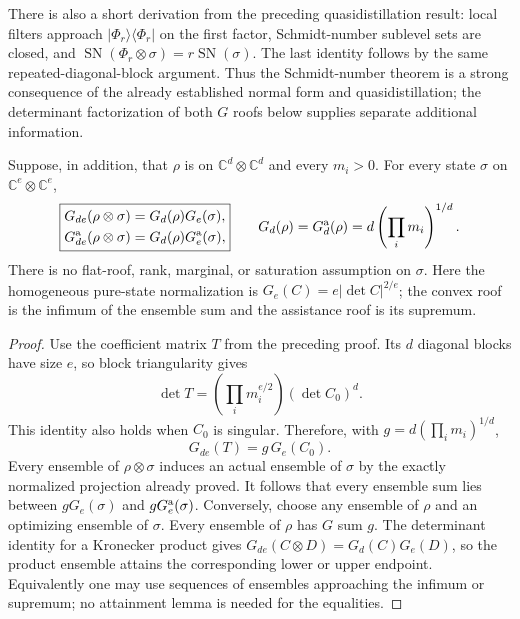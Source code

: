 There is also a short derivation from the preceding quasidistillation
result: local filters approach $|\Phi_r\rangle\langle\Phi_r|$ on the first
factor, Schmidt-number sublevel sets are closed, and
$\operatorname{SN}(\Phi_r\otimes\sigma)=r\operatorname{SN}(\sigma)$.
The last identity follows by the same repeated-diagonal-block argument.
Thus the Schmidt-number theorem is a strong consequence of the already
established normal form and quasidistillation; the determinant factorization
of both $G$ roofs below supplies separate additional information.

\begin{theorem}
\label{thm:universal-g}
Suppose, in addition, that $\rho$ is on $\mathbb C^d\otimes\mathbb C^d$
and every $m_i>0$. For every state $\sigma$ on
$\mathbb C^e\otimes\mathbb C^e$,
\[
 \boxed{\begin{aligned}
 G_{de}(\rho\otimes\sigma)&=G_d(\rho)G_e(\sigma),\\
 G_{de}^{\rm a}(\rho\otimes\sigma)&=G_d(\rho)G_e^{\rm a}(\sigma),
 \end{aligned}}
 \qquad
 G_d(\rho)=G_d^{\rm a}(\rho)
              =d\left(\prod_i m_i\right)^{1/d}.
\]
There is no flat-roof, rank, marginal, or saturation assumption on
$\sigma$. Here the homogeneous pure-state normalization is
$G_e(C)=e|\det C|^{2/e}$; the convex roof is the infimum of the ensemble
sum and the assistance roof is its supremum.
\end{theorem}
\begin{proof}
Use the coefficient matrix $T$ from the preceding proof. Its $d$ diagonal
blocks have size $e$, so block triangularity gives
\[
       \det T=\left(\prod_i m_i^{e/2}\right)(\det C_0)^d.
\]
This identity also holds when $C_0$ is singular. Therefore, with
$g=d(\prod_i m_i)^{1/d}$,
\[
                   G_{de}(T)=g\,G_e(C_0).
\]
Every ensemble of $\rho\otimes\sigma$ induces an actual ensemble of
$\sigma$ by the exactly normalized projection already proved. It follows
that every ensemble sum lies between $gG_e(\sigma)$ and
$gG_e^{\rm a}(\sigma)$.
Conversely, choose any ensemble of $\rho$ and an optimizing ensemble of
$\sigma$. Every ensemble of $\rho$ has $G$ sum $g$. The determinant
identity for a Kronecker product gives
$G_{de}(C\otimes D)=G_d(C)G_e(D)$, so the product ensemble attains the
corresponding lower or upper endpoint. Equivalently one may use sequences
of ensembles approaching the infimum or supremum; no attainment lemma is
needed for the equalities.
\end{proof}

